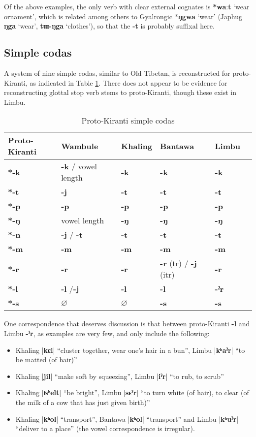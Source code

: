 \documentclass[oldfontcommands,oneside,a4paper,11pt]{article}
\newcommand{\ipa}[1]{\textbf{{\phon\mbox{#1}}}} %
\newcommand{\dhatu}[2]{|\ipa{#1}| ``#2''}
\begin{document}
Of the above examples, the only verb with clear external cognates is \ipa{*waːt} `wear ornament', which is related among others to Gyalrongic *\ipa{ŋgwa} `wear' (Japhug \ipa{ŋga} `wear', \ipa{tɯ-ŋga} `clothes'), so that the \ipa{-t} is probably suffixal here. 

\subsection{Simple codas} \label{sec:codas}
A system of nine simple codas, similar to Old Tibetan, is reconstructed for proto-Kiranti, as indicated in Table \ref{tab:codas}. There does not appear to be evidence for reconstructing glottal stop verb stems to proto-Kiranti, though these exist in Limbu.

\begin{table}[H]
\caption{Proto-Kiranti simple codas} \centering \label{tab:codas}
\begin{tabular}{llllll}
\toprule
Proto-Kiranti & Wambule & Khaling & Bantawa & Limbu \\
\midrule
\ipa{*-k} & \ipa{-k} / vowel length& \ipa{-k} & \ipa{-k} & \ipa{-k}  \\
\ipa{*-t} & \ipa{-j} & \ipa{-t} & \ipa{-t} & \ipa{-t}  \\
\ipa{*-p} & \ipa{-p} & \ipa{-p} & \ipa{-p} & \ipa{-p}  \\
\midrule
\ipa{*-ŋ} & vowel length & \ipa{-ŋ} & \ipa{-ŋ} & \ipa{-ŋ}  \\
\ipa{*-n} & \ipa{-j} /  \ipa{-t} & \ipa{-t} & \ipa{-t} & \ipa{-t}  \\
\ipa{*-m} & \ipa{-m} & \ipa{-m} & \ipa{-m} & \ipa{-m}  \\
\midrule
\ipa{*-r} &  \ipa{-r}  & \ipa{-r} & \ipa{-r} (tr) / \ipa{-j} (itr) & \ipa{-r}  \\
\ipa{*-l} & \ipa{-l} /\ipa{-j}  & \ipa{-l} & \ipa{-l} & \ipa{-ˀr}  \\
\ipa{*-s} &$\varnothing$ & $\varnothing$ & \ipa{-s} & \ipa{-s}  \\
\bottomrule
\end{tabular}
\end{table}

One correspondence that deserves discussion is that between proto-Kiranti \ipa{-l} and Limbu \ipa{-ˀr}, as examples are very few, and only include the following:

\begin{itemize}
\item  Khaling \dhatu{kɛl}{cluster together, wear one's hair in a bun}, Limbu \dhatu{kʰaˀr}{to be matted (of hair)}  			 
\item  Khaling \dhatu{jil}{make soft by squeezing}, Limbu \dhatu{iˀr}{to rub, to scrub}  		 
\item   Khaling \dhatu{ʦʰelt}{be bright}, Limbu \dhatu{sɛˀr}{to turn white (of hair), to clear (of the milk of a cow that has just given birth)}  
\item Khaling \dhatu{kʰol}{transport}, Bantawa	  \dhatu{kʰol}{transport}	 and	 Limbu \dhatu{kʰuˀr}{deliver to a place}	  (the vowel correspondence is irregular).
\end{itemize}
\end{document}
